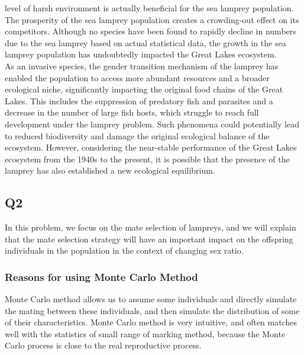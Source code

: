 \documentclass[12pt]{article}
\begin{document}
level of harsh environment is actually beneficial for the sea lamprey population. The prosperity 
of the sea lamprey population creates a crowding-out effect on its competitors. 
Although no species have been found to rapidly decline in numbers due to the sea 
lamprey based on actual statistical data, the growth in the sea lamprey population has undoubtedly 
impacted the Great Lakes ecosystem. \\
As an invasive species, the gender transition mechanism of the lamprey has enabled the population 
to access more abundant resources and a broader ecological niche, significantly impacting the 
original food chains of the Great Lakes. This includes the suppression of predatory fish and 
parasites and a decrease in the number of large fish hosts, which struggle to reach full 
development under the lamprey problem. Such phenomena could potentially lead to reduced 
biodiversity and damage the original ecological balance of the ecosystem. However, considering 
the near-stable performance of the Great Lakes ecosystem from the 1940s to the present, it is 
possible that the presence of the lamprey has also established a new ecological equilibrium. 
\subsection{Q2}
In this problem, we focus on the mate selection of lampreys, and we will explain that the mate 
selection strategy will have an important impact on the offspring individuals in the 
population in the context of changing sex ratio.
\subsubsection{Reasons for using Monte Carlo Method}
Monte Carlo method allows us to assume some individuals and directly simulate the mating between 
these individuals, and then simulate the distribution of some of their characteristics. 
Monte Carlo method is very intuitive, and often matches well with the statistics of small 
range of marking method, because the Monte Carlo process is close to the real reproductive process. 
\end{document}

